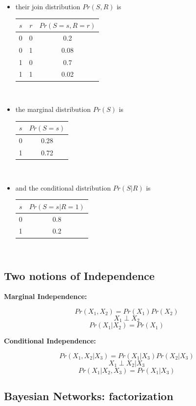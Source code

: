\documentclass[12pt]{article}
\begin{document}
\begin{itemize}
	\item their join distribution $Pr(S,R)$ is\\
		\begin{tabular}{|c|c|c|}
			\hline
			$s$ & $r$ & $Pr(S=s, R=r)$ \\
			\hline
			0 & 0 & 0.2\\
			\hline
			0 & 1 & 0.08\\
			\hline
			1 & 0 & 0.7\\
			\hline
			1 & 1 & 0.02\\
			\hline
		\end{tabular}~\\
	\item the marginal distribution $Pr(S)$ is\\
		\begin{tabular}{|c|c|}
			\hline
			$s$ & $Pr(S=s)$ \\
			\hline
			0 & 0.28\\
			1 & 0.72\\
			\hline
		\end{tabular}~\\
	\item and the conditional distribution $Pr(S|R)$ is\\
		\begin{tabular}{|c|c|}
			\hline
			$s$ & $Pr(S=s | R=1)$ \\
			\hline
			0 & 0.8\\
			1 & 0.2\\
			\hline
		\end{tabular}~\\
\end{itemize}

\subsection{Two notions of Independence}

\textbf{Marginal Independence:}

\[ Pr(X_1, X_2) = Pr(X_1)Pr(X_2) \]
\[ X_1 \perp X_2 \]
\[ Pr(X_1 | X_2) = Pr(X_1) \]

\textbf{Conditional Independence:}

\[ Pr(X_1, X_2 | X_3) = Pr(X_1|X_3)Pr(X_2|X_3) \]
\[ X_1 \perp X_2 | X_3 \]
\[ Pr(X_1 | X_2,X_3) = Pr(X_1|X_3) \]

\subsection{Bayesian Networks: factorization}
\end{document}
